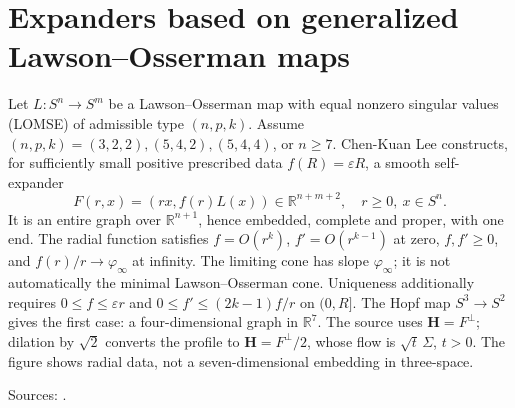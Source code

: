 \chapter{Expanders based on generalized Lawson--Osserman maps}\label{sec:catalogue-lawson-osserman-expanders}
\begin{example}\label{ex:catalogue-lawson-osserman-expanders}
Let $L:S^n\to S^m$ be a Lawson--Osserman map with equal nonzero singular values (LOMSE) of admissible type $(n,p,k)$. Assume $(n,p,k)=(3,2,2),(5,4,2),(5,4,4)$, or $n\ge7$. Chen-Kuan Lee constructs, for sufficiently small positive prescribed data $f(R)=\varepsilon R$, a smooth self-expander
\[
 F(r,x)=(rx,f(r)L(x))\in\mathbb R^{n+m+2},\quad r\ge0,\ x\in S^n.
\]
It is an entire graph over $\mathbb R^{n+1}$, hence embedded, complete and proper, with one end. The radial function satisfies $f=O(r^k)$, $f'=O(r^{k-1})$ at zero, $f,f'\ge0$, and $f(r)/r\to\varphi_\infty$ at infinity. The limiting cone has slope $\varphi_\infty$; it is not automatically the minimal Lawson--Osserman cone. Uniqueness additionally requires $0\le f\le\varepsilon r$ and $0\le f'\le(2k-1)f/r$ on $(0,R]$.
The Hopf map $S^3\to S^2$ gives the first case: a four-dimensional graph in $\mathbb R^7$. The source uses $\mathbf H=F^\perp$; dilation by $\sqrt2$ converts the profile to $\mathbf H=F^\perp/2$, whose flow is $\sqrt t\,\Sigma$, $t>0$. The figure shows radial data, not a seven-dimensional embedding in three-space.
\par Sources: \cite{CatLee2023}.
\end{example}

